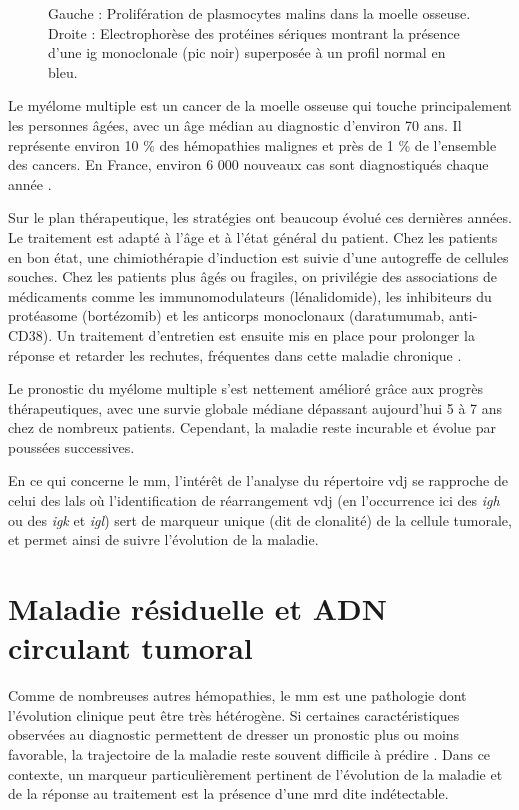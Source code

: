 \begin{figure}[H]
\begin{minipage}{0.45\textwidth}
    \end{minipage}
    \caption{Gauche : Prolifération de plasmocytes malins dans la moelle osseuse.
        Droite : Electrophorèse des protéines sériques montrant la présence d'une \gls{ig} monoclonale (pic noir)
        superposée à un profil normal en bleu.}
    \label{fig:mm-cells-ig}
\end{figure}

Le myélome multiple est un cancer de la moelle osseuse qui touche principalement 
les personnes âgées, avec un âge médian au diagnostic d'environ 70 ans. 
Il représente environ 10 \% des hémopathies malignes et près de 1 \% de l'ensemble des cancers. 
En France, environ 6 000 nouveaux cas sont diagnostiqués chaque année 
\cite{spfSurviePersonnesAtteintes}.

Sur le plan thérapeutique, les stratégies ont beaucoup évolué ces dernières années. 
Le traitement est adapté à l'âge et à l'état général du patient. 
Chez les patients en bon état, une chimiothérapie d'induction est suivie d'une autogreffe 
de cellules souches. Chez les patients plus âgés ou fragiles, on privilégie des associations 
de médicaments comme les immunomodulateurs (lénalidomide), les inhibiteurs du protéasome 
(bortézomib) et les anticorps monoclonaux (daratumumab, anti-CD38). 
Un traitement d'entretien est ensuite mis en place pour prolonger la réponse et retarder 
les rechutes, fréquentes dans cette maladie chronique 
\cite{cowanDiagnosisManagementMultiple2022a}.

Le pronostic du myélome multiple s'est nettement amélioré grâce aux progrès thérapeutiques, 
avec une survie globale médiane dépassant aujourd'hui 5 à 7 ans chez de nombreux patients. 
Cependant, la maladie reste incurable et évolue par poussées successives.

En ce qui concerne le \gls{mm}, l'intérêt de l'analyse du répertoire \gls{vdj}
se rapproche de celui des \glspl{lal} où l'identification de réarrangement
\gls{vdj} (en l'occurrence ici des \textit{\gls{igh}} ou des \textit{\gls{igk}}
et \textit{\gls{igl}}) sert de marqueur unique (dit de clonalité) de la cellule
tumorale, et permet ainsi de suivre l'évolution de la maladie.

\section{Maladie résiduelle et ADN circulant tumoral}

Comme de nombreuses autres hémopathies, le \gls{mm} est une pathologie dont
l'évolution clinique peut être très hétérogène. Si certaines caractéristiques
observées au diagnostic permettent de dresser un pronostic plus ou moins
favorable, la trajectoire de la maladie reste souvent difficile à prédire
\cite{hanamuraMultipleMyelomaHighrisk2022}. Dans ce contexte, un marqueur
particulièrement pertinent de l'évolution de la maladie et de la réponse au
traitement est la présence d'une \gls{mrd} dite indétectable.

